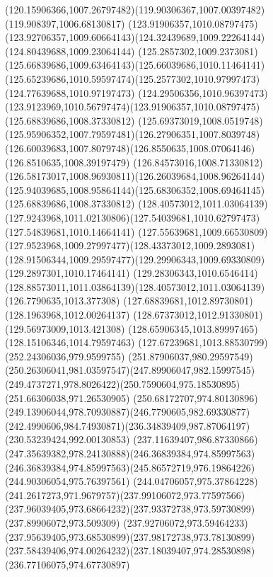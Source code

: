 {    \curveto(120.15906366,1007.26797482)(119.90306367,1007.00397482)(119.908397,1006.68130817)
    \moveto(123.91906357,1010.08797475)
    \curveto(123.92706357,1009.60664143)(124.32439689,1009.22264144)(124.80439688,1009.23064144)
    \curveto(125.2857302,1009.2373081)(125.66839686,1009.63464143)(125.66039686,1010.11464141)
    \curveto(125.65239686,1010.59597474)(125.2577302,1010.97997473)(124.77639688,1010.97197473)
    \curveto(124.29506356,1010.96397473)(123.9123969,1010.56797474)(123.91906357,1010.08797475)
    \moveto(125.68839686,1008.37330812)
    \curveto(125.69373019,1008.0519748)(125.95906352,1007.79597481)(126.27906351,1007.8039748)
    \curveto(126.60039683,1007.8079748)(126.8550635,1008.07064146)(126.8510635,1008.39197479)
    \curveto(126.84573016,1008.71330812)(126.58173017,1008.96930811)(126.26039684,1008.96264144)
    \curveto(125.94039685,1008.95864144)(125.68306352,1008.69464145)(125.68839686,1008.37330812)
    \moveto(128.40573012,1011.03064139)
    \curveto(127.9243968,1011.02130806)(127.54039681,1010.62797473)(127.54839681,1010.14664141)
    \curveto(127.55639681,1009.66530809)(127.9523968,1009.27997477)(128.43373012,1009.2893081)
    \curveto(128.91506344,1009.29597477)(129.29906343,1009.69330809)(129.2897301,1010.17464141)
    \curveto(129.28306343,1010.6546414)(128.88573011,1011.03864139)(128.40573012,1011.03064139)
    \moveto(126.7790635,1013.377308)
    \lineto(127.68839681,1012.89730801)
    \lineto(128.1963968,1012.00264137)
    \lineto(128.67373012,1012.91330801)
    \lineto(129.56973009,1013.421308)
    \lineto(128.65906345,1013.89997465)
    \lineto(128.15106346,1014.79597463)
    \lineto(127.67239681,1013.88530799)
    \closepath
    \moveto(252.24306036,979.9599755)
    \curveto(251.87906037,980.29597549)(250.26306041,981.03597547)(247.89906047,982.15997545)
    \curveto(249.4737271,978.8026422)(250.7590604,975.18530895)(251.66306038,971.26530905)
    \curveto(250.68172707,974.80130896)(249.13906044,978.70930887)(246.7790605,982.69330877)
    \curveto(242.4990606,984.74930871)(236.34839409,987.87064197)(230.53239424,992.00130853)
    \curveto(237.11639407,986.87330866)(247.35639382,978.24130888)(246.36839384,974.85997563)
    \curveto(246.36839384,974.85997563)(245.86572719,976.19864226)(244.90306054,975.76397561)
    \curveto(244.04706057,975.37864228)(241.2617273,971.9679757)(237.99106072,973.77597566)
    \curveto(237.96039405,973.68664232)(237.93372738,973.59730899)(237.89906072,973.509309)
    \curveto(237.92706072,973.59464233)(237.95639405,973.68530899)(237.98172738,973.78130899)
    \curveto(237.58439406,974.00264232)(237.18039407,974.28530898)(236.77106075,974.67730897)
}
